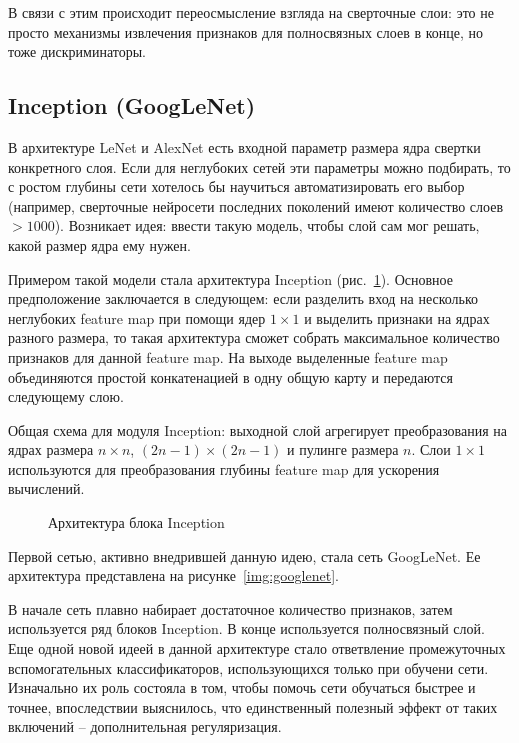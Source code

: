 \documentclass[12pt, specialist, subf, substylefile = spbu.rtx]{disser}
\begin{document}
В связи с этим происходит переосмысление взгляда на сверточные слои: это не просто механизмы извлечения признаков для полносвязных слоев в конце, но тоже дискриминаторы.

\subsection{Inception (GoogLeNet)}

В архитектуре LeNet и AlexNet есть входной параметр размера ядра свертки конкретного слоя. Если для неглубоких сетей эти параметры можно подбирать, то с ростом глубины сети хотелось бы научиться автоматизировать его выбор (например, сверточные нейросети последних поколений имеют количество слоев $>1000$). Возникает идея: ввести такую модель, чтобы слой сам мог решать, какой размер ядра ему нужен.

Примером такой модели стала архитектура Inception (рис.~\ref{img:inception_layer}). Основное предположение заключается в следующем: если разделить вход на несколько неглубоких feature map при помощи ядер $1 \times 1$ и выделить признаки на ядрах разного размера, то такая архитектура сможет собрать максимальное количество признаков для данной feature map. На выходе выделенные feature map объединяются простой конкатенацией в одну общую карту и передаются следующему слою.

Общая схема для модуля Inception: выходной слой агрегирует преобразования на ядрах размера $n \times n$, $(2n-1) \times (2n-1)$ и пулинге размера $n$. Слои $1 \times 1$ используются для преобразования глубины feature map для ускорения вычислений.

\begin{figure}[h]
\caption{Архитектура блока Inception}
\label{img:inception_layer}
\end{figure}

Первой сетью, активно внедрившей данную идею, стала сеть GoogLeNet. Ее архитектура представлена на рисунке~\ref{img:googlenet}.

В начале сеть плавно набирает достаточное количество признаков, затем используется ряд блоков Inception. В конце используется полносвязный слой. Еще одной новой идеей в данной архитектуре стало ответвление промежуточных вспомогательных классификаторов, использующихся только при обучени сети. Изначально их роль состояла в том, чтобы помочь сети обучаться быстрее и точнее, впоследствии выяснилось, что единственный полезный эффект от таких включений -- дополнительная регуляризация.
\end{document}
